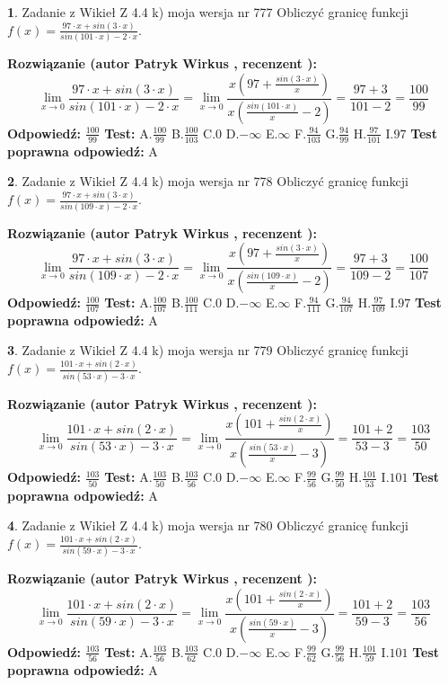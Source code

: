 \documentclass[12pt, a4paper]{article}
\theoremstyle{definition} %
\newtheorem{zad}{}
\newcommand{\zadStart}[1]{\begin{zad}#1\newline}
\newcommand{\zadStop}{\end{zad}}
\newcommand{\rozwStart}[2]{\noindent \textbf{Rozwiązanie (autor #1 , recenzent #2): }\newline}
\newcommand{\rozwStop}{\newline}
\newcommand{\odpStart}{\noindent \textbf{Odpowiedź:}\newline}
\newcommand{\odpStop}{\newline}
\newcommand{\testStart}{\noindent \textbf{Test:}\newline}
\newcommand{\testStop}{\newline}
\newcommand{\kluczStart}{\noindent \textbf{Test poprawna odpowiedź:}\newline}
\newcommand{\kluczStop}{\newline}
\begin{document}
\zadStart{Zadanie z Wikieł Z 4.4 k) moja wersja nr 777}
Obliczyć granicę funkcji $f(x)=\frac{97\cdot x +sin(3\cdot x)}{sin(101\cdot x) -2\cdot x}$.
\zadStop
\rozwStart{Patryk Wirkus}{}
$$\lim\limits_{x\to 0}\frac{97\cdot x +sin(3\cdot x)}{sin(101\cdot x) -2\cdot x}
=\lim\limits_{x\to 0}\frac{x(97+\frac{sin(3\cdot x)}{x})}{x(\frac{sin(101\cdot x)}{x}-2)}
=\frac{97+3}{101-2} = \frac{100}{99}$$
\rozwStop
\odpStart
$\frac{100}{99}$
\odpStop
\testStart
A.$\frac{100}{99}$
B.$\frac{100}{103}$
C.$0$
D.$-\infty$
E.$\infty$
F.$\frac{94}{103}$
G.$\frac{94}{99}$
H.$\frac{97}{101}$
I.$97$
\testStop
\kluczStart
A
\kluczStop



\zadStart{Zadanie z Wikieł Z 4.4 k) moja wersja nr 778}
Obliczyć granicę funkcji $f(x)=\frac{97\cdot x +sin(3\cdot x)}{sin(109\cdot x) -2\cdot x}$.
\zadStop
\rozwStart{Patryk Wirkus}{}
$$\lim\limits_{x\to 0}\frac{97\cdot x +sin(3\cdot x)}{sin(109\cdot x) -2\cdot x}
=\lim\limits_{x\to 0}\frac{x(97+\frac{sin(3\cdot x)}{x})}{x(\frac{sin(109\cdot x)}{x}-2)}
=\frac{97+3}{109-2} = \frac{100}{107}$$
\rozwStop
\odpStart
$\frac{100}{107}$
\odpStop
\testStart
A.$\frac{100}{107}$
B.$\frac{100}{111}$
C.$0$
D.$-\infty$
E.$\infty$
F.$\frac{94}{111}$
G.$\frac{94}{107}$
H.$\frac{97}{109}$
I.$97$
\testStop
\kluczStart
A
\kluczStop



\zadStart{Zadanie z Wikieł Z 4.4 k) moja wersja nr 779}
Obliczyć granicę funkcji $f(x)=\frac{101\cdot x +sin(2\cdot x)}{sin(53\cdot x) -3\cdot x}$.
\zadStop
\rozwStart{Patryk Wirkus}{}
$$\lim\limits_{x\to 0}\frac{101\cdot x +sin(2\cdot x)}{sin(53\cdot x) -3\cdot x}
=\lim\limits_{x\to 0}\frac{x(101+\frac{sin(2\cdot x)}{x})}{x(\frac{sin(53\cdot x)}{x}-3)}
=\frac{101+2}{53-3} = \frac{103}{50}$$
\rozwStop
\odpStart
$\frac{103}{50}$
\odpStop
\testStart
A.$\frac{103}{50}$
B.$\frac{103}{56}$
C.$0$
D.$-\infty$
E.$\infty$
F.$\frac{99}{56}$
G.$\frac{99}{50}$
H.$\frac{101}{53}$
I.$101$
\testStop
\kluczStart
A
\kluczStop



\zadStart{Zadanie z Wikieł Z 4.4 k) moja wersja nr 780}
Obliczyć granicę funkcji $f(x)=\frac{101\cdot x +sin(2\cdot x)}{sin(59\cdot x) -3\cdot x}$.
\zadStop
\rozwStart{Patryk Wirkus}{}
$$\lim\limits_{x\to 0}\frac{101\cdot x +sin(2\cdot x)}{sin(59\cdot x) -3\cdot x}
=\lim\limits_{x\to 0}\frac{x(101+\frac{sin(2\cdot x)}{x})}{x(\frac{sin(59\cdot x)}{x}-3)}
=\frac{101+2}{59-3} = \frac{103}{56}$$
\rozwStop
\odpStart
$\frac{103}{56}$
\odpStop
\testStart
A.$\frac{103}{56}$
B.$\frac{103}{62}$
C.$0$
D.$-\infty$
E.$\infty$
F.$\frac{99}{62}$
G.$\frac{99}{56}$
H.$\frac{101}{59}$
I.$101$
\testStop
\kluczStart
A
\kluczStop
\end{document}
